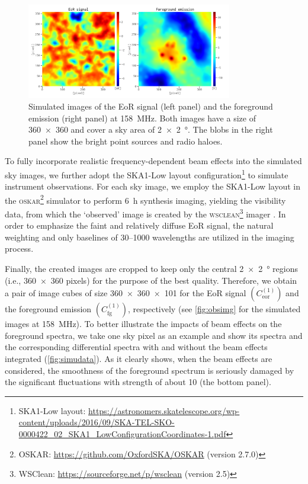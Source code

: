 \documentclass[fleqn,usenatbib]{mnras}
\newcommand{\R}[1]{\mathrm{#1}}
\newcommand{\editwip}[1]{{\leavevmode\color{magenta}#1}}
\begin{document}
{\begin{figure}
  \centering
  \includegraphics[width=0.8\textwidth]{obsimg-158}
  \caption{\label{fig:obsimg}\editwip{%
    Simulated images of the EoR signal (left panel) and the foreground
    emission (right panel) at \SI{158}{\MHz}.
    Both images have a size of \num{360 x 360} and cover a sky area of
    \SI{2 x 2}{\degree}.
    The blobs in the right panel show the bright point sources and radio
    haloes.
  }}
\end{figure}

To fully incorporate realistic frequency-dependent beam effects into the
simulated sky images, we further adopt the SKA1-Low layout
configuration\footnote{\raggedright%
  SKA1-Low layout:
  \url{https://astronomers.skatelescope.org/wp-content/uploads/2016/09/SKA-TEL-SKO-0000422_02_SKA1_LowConfigurationCoordinates-1.pdf}}
to simulate instrument observations.
For each sky image, we employ the SKA1-Low layout in the
\textsc{oskar}\footnote{%
  OSKAR: \url{https://github.com/OxfordSKA/OSKAR} (version 2.7.0)}
simulator \citep{mort2010} to perform \SI{6}{\hour} synthesis imaging,
yielding the visibility data, from which the `observed'
image is created by the \textsc{wsclean}\footnote{%
  WSClean: \url{https://sourceforge.net/p/wsclean} (version 2.5)}
imager \citep{offringa2014}.
In order to emphasize the faint and relatively diffuse EoR signal, the
natural weighting and only baselines of \numrange{30}{1000} wavelengths are
utilized in the imaging process.} %
Finally, the created images are cropped to keep only the central
\SI{2 x 2}{\degree} regions (i.e., \num{360 x 360} pixels) for the
purpose of the best quality.
Therefore, we obtain \editwip{a pair of} image cubes of size
\num{360 x 360 x 101} for the EoR signal $\left( C_{\R{eor}}^{(1)} \right)$
and the foreground emission $\left( C_{\R{fg}}^{(1)} \right)$, respectively
\editwip{%
(see \autoref{fig:obsimg} for the simulated images at \SI{158}{\MHz}).
To better illustrate the impacts of beam effects on the foreground spectra,
we take one sky pixel as an example and show its spectra and the
corresponding differential spectra with and without the beam effects
integrated (\autoref{fig:simudata}).} %
As it clearly shows, when the beam effects are considered, the smoothness
of the foreground spectrum is seriously damaged by the significant
fluctuations with strength of about \SI{10}{\mK} (the bottom panel).
\end{document}
